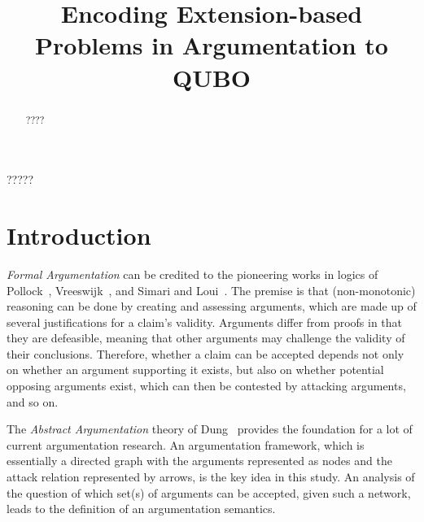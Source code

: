 \documentclass[conference]{IEEEtran}
\begin{document}
\title{Encoding Extension-based Problems in Argumentation to QUBO}

\author{
\and
{}
}

\maketitle

\begin{abstract}
????
\end{abstract}

\begin{IEEEkeywords}
?????
\end{IEEEkeywords}

\section{Introduction}\label{sec:intro}
\emph{Formal Argumentation} can be credited to the pioneering works in logics of Pollock~\cite{pollock92}, Vreeswijk~\cite{vreeswijk92}, and Simari and Loui~\cite{simari92}. The premise is that (non-monotonic) reasoning can be done by creating and assessing arguments, which are made up of several justifications for a claim's validity. Arguments differ from proofs in that they are defeasible, meaning that other arguments may challenge the validity of their conclusions. Therefore, whether a claim can be accepted depends not only on whether an argument supporting it exists, but also on whether potential opposing arguments exist, which can then be contested by attacking arguments, and so on.

The \emph{Abstract Argumentation} theory of Dung~\cite{Dung:1995} provides the foundation for a lot of current argumentation research. An argumentation framework, which is essentially a directed graph with the arguments represented as nodes and the attack relation represented by arrows, is the key idea in this study. An analysis of the question of which set(s) of arguments can be accepted, given such a network, leads to the definition of an argumentation semantics. 
\end{document}
